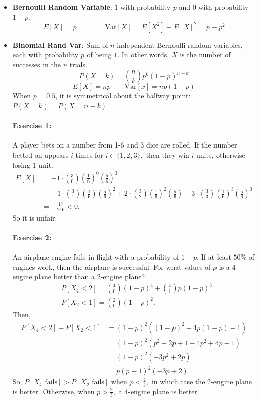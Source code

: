 \documentclass[12pt]{article}
\begin{document}
\begin{itemize}
    \item{ \textbf{Bernoulli Random Variable}: $1$ with probability $p$ and $0$ with probability $1-p$. \[E[X] = p \qquad\qquad \text{Var}[X] = E[X^2]-E[X]^2=p-p^2\]}
    \item{\textbf{Binomial Rand Var}: Sum of $n$ independent Bernoulli random variables, each with probability $p$ of being $1$. In other words, $X$ is the number of successes in the $n$ trials.
    \[P(X=k)=\binom{n}{k}p^k(1-p)^{n-k}\]
    \[E[X] = n p \qquad \text{Var}[x] = n p (1-p)\]
    When $p=0.5$, it is symmetrical about the halfway point: $P(X=k) = P(X=n-k)$
    
    \paragraph{Exercise 1:} A player bets on a number from 1-6 and 3 dice are rolled. If the number betted on appears $i$ times for $i\in\{1,2,3\},$ then they win $i$ units, otherwise losing $1$ unit.
\begin{align*}E[X] &= -1\cdot\binom{3}{0}\left(\frac{1}{6}\right)^0\left(\frac{5}{6}\right)^3\\&\quad+1\cdot\binom{3}{1}\left(\frac{1}{6}\right)\left(\frac{5}{6}\right)^2+2\cdot\binom{3}{2}\left(\frac{1}{6}\right)^2\left(\frac{5}{6}\right)+3\cdot\binom{3}{3}\left(\frac{1}{6}\right)^3\left(\frac{5}{6}\right)^0\\&=-\frac{17}{216}<0.\end{align*} So it is unfair.

    \paragraph{Exercise 2:}
    An airplane engine fails in flight with a probability of $1-p.$ If at least $50\%$ of engines work, then the airplane is successful. For what values of $p$ is a 4-engine plane better than a 2-engine plane?
    \begin{align*}
        &P[X_4 < 2] = \binom{4}{0}(1-p)^4+\binom{4}{1}p(1-p)^3\\
        &P[X_2 < 1] = \binom{2}{0}(1-p)^2.
    \end{align*}
    Then,
    \begin{align*}
        P[X_4<2]-P[X_2<1]&=(1-p)^2((1-p)^2+4p(1-p)-1)\\
        &=(1-p)^2(p^2-2p+1-4p^2+4p-1)\\
        &=(1-p)^2(-3p^2+2p)\\
        &=p(p-1)^2(-3p+2).
    \end{align*}
    So, $P[X_4\text{ fails}]>P[X_2\text{ fails}]$ when $p<\frac{2}{3},$ in which case the 2-engine plane is better. Otherwise, when $p>\frac{2}{3},$ a 4-engine plane is better.
}
\end{itemize}
\end{document}
